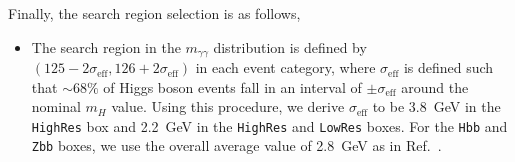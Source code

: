 
Finally, the search region selection is as follows,
\begin{itemize}
\item The search region in the $m_{\gamma\gamma}$ distribution is
    defined by $(125 - 2\sigma_{\mathrm{eff}},
    126+2\sigma_{\mathrm{eff}})$ in each event category, where
    $\sigma_{\mathrm{eff}}$ is defined such that $\sim68\%$ of Higgs
    boson events fall in an interval of $\pm\sigma_{\mathrm{eff}}$
    around the nominal $m_H$ value. Using this procedure, we derive
    $\sigma_{\mathrm{eff}}$ to be 3.8~GeV in the \texttt{HighRes} box
    and 2.2~GeV in the  \texttt{HighRes} and \texttt{LowRes}
    boxes. For the \texttt{Hbb} and \texttt{Zbb} boxes, we use the overall average value
    of 2.8~GeV as in Ref.~\cite{RazorHgaga}.
\end{itemize}

